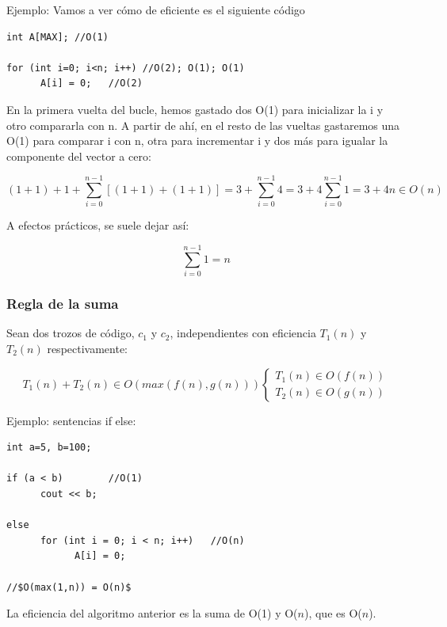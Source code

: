 \documentclass[10pt,a4paper,spanish]{report}
\begin{document}
\noindent
Ejemplo: Vamos a ver cómo de eficiente es el siguiente código
\begin{verbatim}
int A[MAX]; //O(1)

for (int i=0; i<n; i++) //O(2); O(1); O(1)
      A[i] = 0;   //O(2)
\end{verbatim}

\noindent
En la primera vuelta del bucle, hemos gastado dos O(1) para inicializar la i y otro compararla con n. A partir de ahí, en el resto de las vueltas gastaremos una O(1) para comparar i con n, otra para incrementar i y dos más para igualar la componente del vector a cero:

\begin{displaymath}
(1+1) + 1 + \sum_{i=0}^{n-1}[(1+1) + (1+1)] = 3 + \sum_{i=0}^{n-1}4 = 3 + 4 \sum_{i=0}^{n-1}1 = 3 + 4n \in O(n)
\end{displaymath}

\noindent
A efectos prácticos, se suele dejar así:

\begin{displaymath}
\sum_{i=0}^{n-1} 1 = n
\end{displaymath}

\subsubsection{\textcolor[rgb]{0.1,0.2,0.6}Regla de la suma}
\noindent
Sean dos trozos de código, $c_{1}$ y $c_{2}$, independientes con eficiencia $T_{1}(n)$ y $T_{2}(n)$ respectivamente:

\begin{displaymath}
T_{1}(n) + T_{2}(n) \in O(max(f(n),g(n))) \left\{ \begin{array}{ll}
T_{1}(n) \in O(f(n))\\
T_{2}(n) \in O(g(n))
\end{array} \right.
\end{displaymath}

\noindent
Ejemplo: sentencias if else:
\begin{verbatim}
int a=5, b=100;

if (a < b)        //O(1)
      cout << b;

else
      for (int i = 0; i < n; i++)   //O(n)
            A[i] = 0;

//$O(max(1,n)) = O(n)$
\end{verbatim}

\noindent
La eficiencia del algoritmo anterior es la suma de O(1) y O($n$), que es O($n$).
\end{document}

